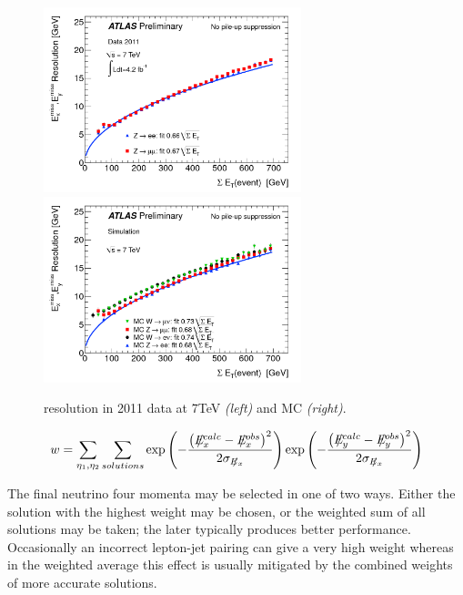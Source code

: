 \begin{figure}[htbp!]
	\begin{center}
	\includegraphics[width=75mm]{f/MET_res_data}
	\includegraphics[width=75mm]{f/MET_res_MC}
	\end{center}
	\caption{\etmiss resolution in 2011 data at 7TeV \emph{(left)} and MC \emph{(right)}. }
	\label{fig:met_res}
	\end{figure}

\begin{equation}
    w=\sum_{\eta_{1},\eta_{2}}\sum_{solutions}    
    \exp\left(-\frac{\left(\metx^{calc}-\metx^{obs} \right)^{2}}{2\sigmet} \right)
    \exp\left(-\frac{\left(\mety^{calc}-\mety^{obs} \right)^{2}}{2\sigmet}
    \right)
    \label{eq:weight}
    \end{equation}
     
The final neutrino four momenta may be selected in one of two ways. Either the solution with the highest weight may be chosen, or the weighted sum of all solutions may be taken; the later typically produces better performance. Occasionally an incorrect lepton-jet pairing can give a very high weight whereas in the weighted average this effect is usually mitigated by the combined weights of more accurate solutions.
     
